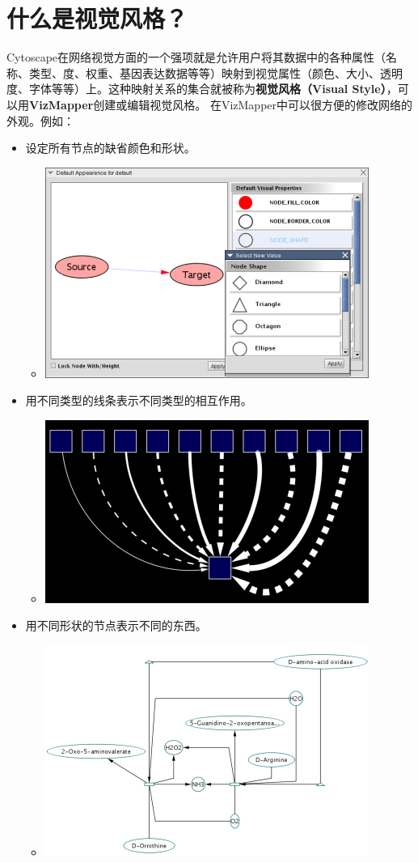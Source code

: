 \section{什么是视觉风格？}
Cytoscape在网络视觉方面的一个强项就是允许用户将其数据中的各种属性（名称、类型、度、权重、基因表达数据等等）映射到视觉属性（颜色、大小、透明度、字体等等）上。这种映射关系的集合就被称为\textbf{视觉风格（Visual Style）}，可以用\textbf{VizMapper}创建或编辑视觉风格。
在VizMapper中可以很方便的修改网络的外观。例如：
\begin{itemize}
\item 设定所有节点的缺省颜色和形状。 \begin{itemize}
\item \centerline{
 \includegraphics[width=.6\textwidth]{images/DefaultColorAndShape.png} }
\end{itemize}

\item 用不同类型的线条表示不同类型的相互作用。\begin{itemize}
\item \centerline{
 \includegraphics[width=.6\textwidth]{images/LineTypes.png} }
\end{itemize}

\item 用不同形状的节点表示不同的东西。\begin{itemize}
\item \centerline{
 \includegraphics[width=.6\textwidth]{images/NodeShapeMapping.png}} 
\end{itemize}


\end{itemize}
